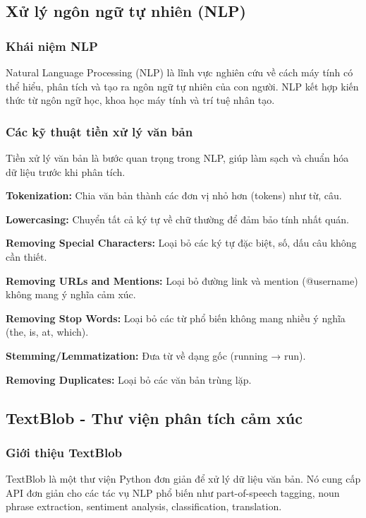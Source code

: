 \subsection{Xử lý ngôn ngữ tự nhiên (NLP)}

\subsubsection{Khái niệm NLP}
Natural Language Processing (NLP) là lĩnh vực nghiên cứu về cách máy tính có thể hiểu, phân tích và tạo ra ngôn ngữ tự nhiên của con người. NLP kết hợp kiến thức từ ngôn ngữ học, khoa học máy tính và trí tuệ nhân tạo.

\subsubsection{Các kỹ thuật tiền xử lý văn bản}
Tiền xử lý văn bản là bước quan trọng trong NLP, giúp làm sạch và chuẩn hóa dữ liệu trước khi phân tích.

\textbf{Tokenization:} Chia văn bản thành các đơn vị nhỏ hơn (tokens) như từ, câu.

\textbf{Lowercasing:} Chuyển tất cả ký tự về chữ thường để đảm bảo tính nhất quán.

\textbf{Removing Special Characters:} Loại bỏ các ký tự đặc biệt, số, dấu câu không cần thiết.

\textbf{Removing URLs and Mentions:} Loại bỏ đường link và mention (@username) không mang ý nghĩa cảm xúc.

\textbf{Removing Stop Words:} Loại bỏ các từ phổ biến không mang nhiều ý nghĩa (the, is, at, which).

\textbf{Stemming/Lemmatization:} Đưa từ về dạng gốc (running → run).

\textbf{Removing Duplicates:} Loại bỏ các văn bản trùng lặp.

\subsection{TextBlob - Thư viện phân tích cảm xúc}

\subsubsection{Giới thiệu TextBlob}
TextBlob là một thư viện Python đơn giản để xử lý dữ liệu văn bản. Nó cung cấp API đơn giản cho các tác vụ NLP phổ biến như part-of-speech tagging, noun phrase extraction, sentiment analysis, classification, translation.

